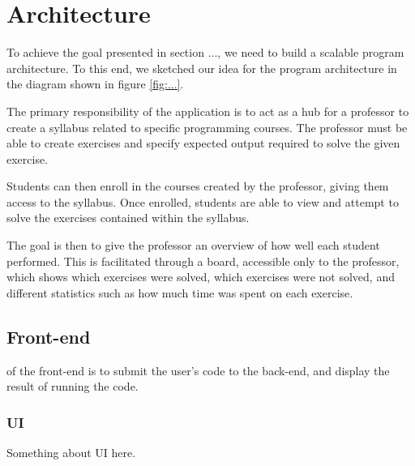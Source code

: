 \section{Architecture}
To achieve the goal presented in section ..., we need to build a scalable program architecture.
To this end, we sketched our idea for the program architecture in the diagram shown in figure \ref{fig:...}.


The primary responsibility of the application is to act as a hub for a professor to create a syllabus related to specific programming courses.
The professor must be able to create exercises and specify expected output required to solve the given exercise.

Students can then enroll in the courses created by the professor, giving them access to the syllabus.
Once enrolled, students are able to view and attempt to solve the exercises contained within the syllabus.

The goal is then to give the professor an overview of how well each student performed.
This is facilitated through a board, accessible only to the professor, which shows which exercises were solved, which exercises were not solved, and different statistics such as how much time was spent on each exercise.


\subsection{Front-end}

of the front-end is to submit the user's code to the back-end, and display the result of running the code.


\subsubsection{UI}
Something about UI here.

